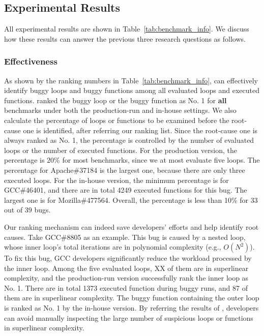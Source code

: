 \subsection{Experimental Results}
\label{sec:results}

All experimental results are shown in Table~\ref{tab:benchmark_info}.
We discuss how these results can answer the previous three research questions as follows.


\subsubsection{Effectiveness}
As shown by the ranking numbers in Table~\ref{tab:benchmark_info},
\Tool can effectively identify buggy loops and buggy functions 
among all evaluated loops and executed functions. 
\Tool ranked the buggy loop or the buggy function as No. 1 
for \textbf{all} benchmarks under both the production-run and in-house settings. 
We also calculate the percentage of loops or functions 
to be examined before the root-cause one is identified, 
after referring our ranking list. 
Since the root-cause one is always ranked as No. 1,
the percentage is controlled by the number of evaluated loops 
or the number of executed functions. 
For the production version, the percentage is $20\%$ for most benchmarks, 
since we at most evaluate five loops. 
The percentage for Apache\#37184 is the largest one, 
because there are only three executed loops. 
For the in-house version, the minimum percentage is for GCC\#46401, 
and there are in total 4249 executed functions for this bug.
The largest one is for Mozilla\#477564. 
Overall, the percentage is less than 10\% for 33 out of 39 bugs. 

Our ranking mechanism can indeed save developers' efforts 
and help identify root causes. 
Take GCC\#8805 as an example.
This bug is caused by a nested loop, 
whose inner loop's total iterations are in polynomial complexity (e.g., $O(N^2)$).
To fix this bug, GCC developers significantly reduce 
the workload processed by the inner loop. 
Among the five evaluated loops, {\color{red} XX} of them are in superlinear complexity, 
and the production-run version successfully rank the inner loop as No. 1.
There are in total 1373 executed function during buggy runs,
and 87 of them are in superlinear complexity. 
The buggy function containing the outer loop is ranked as No. 1 
by the in-house version. 
By referring the results of \Tool, 
developers can avoid manually inspecting the large number of  
suspicious loops or functions in superlinear complexity. 


